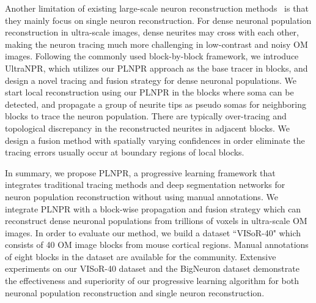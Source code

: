 Another limitation of existing large-scale neuron reconstruction methods~\cite{Zhou2015, Peng2017, Wang2018} is that they mainly focus on single neuron reconstruction. 
%
For dense neuronal population reconstruction in ultra-scale images, dense neurites may cross with each other, making the neuron tracing much more challenging in low-contrast and noisy OM images. 
% 
Following the commonly used block-by-block framework, we introduce UltraNPR, which utilizes our PLNPR approach as the base tracer in blocks, and design a novel tracing and fusion strategy for dense neuronal populations.
%
We start local reconstruction using our PLNPR in the blocks where soma can be detected, and propagate a group of neurite tips as pseudo somas for neighboring blocks to trace the neuron population. 
%
There are typically over-tracing and topological discrepancy in the reconstructed neurites in adjacent blocks. 
We design a fusion method with spatially varying confidences in order eliminate the tracing errors usually occur at boundary regions of local blocks.   


In summary, we propose PLNPR, a progressive learning framework that integrates traditional tracing methods and deep segmentation networks for neuron population reconstruction without using manual annotations.
%
We integrate PLNPR with a block-wise propagation and fusion strategy which can reconstruct dense neuronal populations from trillions of voxels in ultra-scale OM images. 
%
In order to evaluate our method, we build a dataset ``VISoR-40" which consists of 40 OM image blocks from mouse cortical regions. Manual annotations of eight blocks in the dataset are available for the community. 
Extensive experiments on our VISoR-40 dataset and the BigNeuron dataset demonstrate the effectiveness and superiority of our progressive learning algorithm for both neuronal population reconstruction and single neuron reconstruction.




